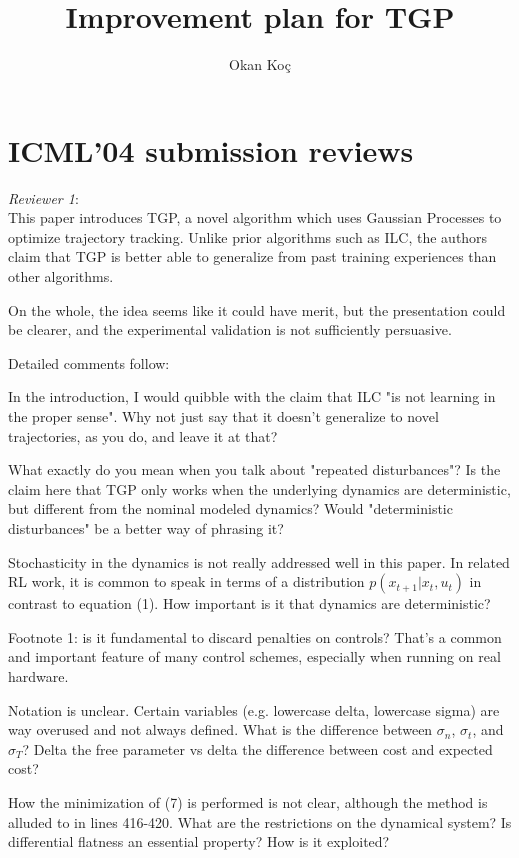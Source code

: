 \documentclass[10pt,a4paper]{article}
\author{Okan Ko\c c}
\title{Improvement plan for TGP}
\begin{document}
\maketitle

\section{ICML'04 submission reviews}
\emph{Reviewer 1}: \\

This paper introduces TGP, a novel algorithm which uses Gaussian Processes to optimize trajectory tracking. Unlike prior algorithms such as ILC, the authors claim that TGP is better able to generalize from past training experiences than other algorithms.

On the whole, the idea seems like it could have merit, but the presentation could be clearer, and the experimental validation is not sufficiently persuasive.

Detailed comments follow:

In the introduction, I would quibble with the claim that ILC "is not learning in the proper sense". Why not just say that it doesn't generalize to novel trajectories, as you do, and leave it at that?

What exactly do you mean when you talk about "repeated disturbances"? Is the claim here that TGP only works when the underlying dynamics are deterministic, but different from the nominal modeled dynamics? Would "deterministic disturbances" be a better way of phrasing it?

Stochasticity in the dynamics is not really addressed well in this paper. In related RL work, it is common to speak in terms of a distribution $p(x_{t+1} | x_t, u_t)$ in contrast to equation (1). How important is it that dynamics are deterministic?

Footnote 1: is it fundamental to discard penalties on controls? That's a common and important feature of many control schemes, especially when running on real hardware.

Notation is unclear. Certain variables (e.g. lowercase delta, lowercase sigma) are way overused and not always defined. What is the difference between $\sigma_n$, $\sigma_t$, and $\sigma_T$? Delta the free parameter vs delta the difference between cost and expected cost? 

How the minimization of (7) is performed is not clear, although the method is alluded to in lines 416-420. What are the restrictions on the dynamical system? Is differential flatness an essential property? How is it exploited?
\end{document}
